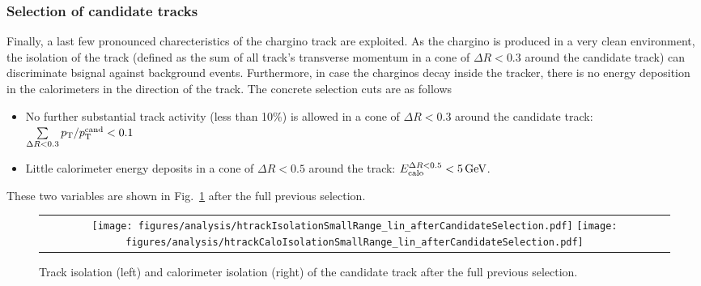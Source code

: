 \subsubsection*{Selection of candidate tracks}
Finally, a last few pronounced charecteristics of the chargino track are exploited.
As the chargino is produced in a very clean environment, the isolation of the track (defined as the sum of all track's transverse momentum in a cone of $\Delta R < 0.3$ around the candidate track) can discriminate bsignal against background events.
Furthermore, in case the charginos decay inside the tracker, there is no energy deposition in the calorimeters in the direction of the track.
The concrete selection cuts are as follows
\begin{itemize}
\renewcommand{\labelitemi}{\footnotesize{\ding{118}}}
\item No further substantial track activity (less than 10\%) is allowed in a cone of $\Delta R < 0.3$ around the candidate track: \mbox{$\sum \limits_{\Delta R < 0.3} p_{\text{T}}/p_{\text{T}}^{\text{cand}} < 0.1$}
\item Little calorimeter energy deposits in a cone of $\Delta R < 0.5$ around the track: \mbox{$E^{\Delta R<0.5}_{\text{calo}}<5\,\text{Ge}\kern-0.06667em\text{V}$}.
\end{itemize}
These two variables are shown in Fig.~\ref{fig:TrackIso_Ecalo_After_Preselection} after the full previous selection.\\
\begin{figure}[!t]
  \centering 
  \begin{tabular}{c}
    \texttt{[image: figures/analysis/htrackIsolationSmallRange\_lin\_afterCandidateSelection.pdf]}
    \texttt{[image: figures/analysis/htrackCaloIsolationSmallRange\_lin\_afterCandidateSelection.pdf]}
  \end{tabular}
  \caption{Track isolation (left) and calorimeter isolation (right) of the candidate track after the full previous selection.}
  \label{fig:TrackIso_Ecalo_After_Preselection}
\end{figure}

